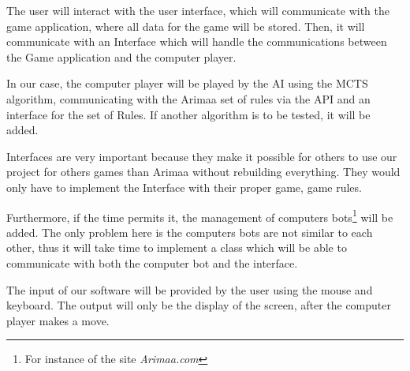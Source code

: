 The user will interact with the user interface, which will communicate with the game application, where all data for the game will be stored. Then, it will communicate with an Interface which will handle the communications between the Game application and the computer player. 

In our case, the computer player will be played by the AI using the MCTS algorithm, communicating with the Arimaa set of rules via the API and an interface for the set of Rules.  If another algorithm is to be tested, it will be added.

Interfaces are very important because they make it possible for others to use our project for others games than Arimaa without rebuilding everything. They would only have to implement the Interface with their proper game, game rules.

Furthermore, if the time permits it, the management of computers bots\footnote{For instance of the site \textit{Arimaa.com}} will be added. The only problem here is the computers bots are not similar to each other, thus it will take time to implement a class which will be able to communicate with both the computer bot and the interface.

The input of our software will be provided by the user using the mouse and keyboard. The output will only be the display of the screen, after the computer player makes a move.